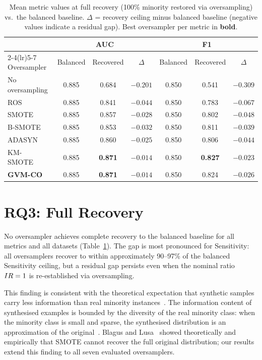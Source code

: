 \begin{table}[ht]
\centering
\caption{Mean metric values at full recovery (100\% minority restored via oversampling) vs.\ the balanced baseline.
$\Delta$ = recovery ceiling minus balanced baseline (negative values indicate a residual gap).
Best oversampler per metric in \textbf{bold}.}
\label{tab:rec_summary}
\setlength{\tabcolsep}{5pt}
\begin{tabular}{l ccc ccc}
\toprule
& \multicolumn{3}{c}{AUC} & \multicolumn{3}{c}{F1} \\
\cmidrule(lr){2-4}\cmidrule(lr){5-7}
Oversampler & Balanced & Recovered & $\Delta$ & Balanced & Recovered & $\Delta$ \\
\midrule
No oversampling   & 0.885 & 0.684 & $-0.201$ & 0.850 & 0.541 & $-0.309$ \\
ROS~\cite{fernandez2018learning}        & 0.885 & 0.841 & $-0.044$ & 0.850 & 0.783 & $-0.067$ \\
SMOTE~\cite{chawla2002smote}            & 0.885 & 0.857 & $-0.028$ & 0.850 & 0.802 & $-0.048$ \\
B-SMOTE~\cite{han2005borderline}        & 0.885 & 0.853 & $-0.032$ & 0.850 & 0.811 & $-0.039$ \\
ADASYN~\cite{he2008adasyn}              & 0.885 & 0.860 & $-0.025$ & 0.850 & 0.806 & $-0.044$ \\
KM-SMOTE~\cite{douzas2018improving}     & 0.885 & \textbf{0.871} & $-0.014$ & 0.850 & \textbf{0.827} & $-0.023$ \\
\textbf{GVM-CO}~\cite{hajiannejad2025circular} & 0.885 & \textbf{0.871} & $-0.014$ & 0.850 & 0.824 & $-0.026$ \\
\bottomrule
\end{tabular}
\end{table}


\section{RQ3: Full Recovery}
\label{sec:rec:rq3}

No oversampler achieves complete recovery to the balanced baseline for all metrics and all datasets (Table~\ref{tab:rec_summary}).
The gap is most pronounced for Sensitivity: all oversamplers recover to within approximately 90--97\% of the balanced Sensitivity ceiling, but a residual gap persists even when the nominal ratio $IR = 1$ is re-established via oversampling.

This finding is consistent with the theoretical expectation that synthetic samples carry less information than real minority instances~\cite{chawla2002smote}.
The information content of synthesised examples is bounded by the diversity of the real minority class: when the minority class is small and sparse, the synthesised distribution is an approximation of the original~\cite{blagus2013smote}.
Blagus and Lusa~\cite{blagus2013smote} showed theoretically and empirically that SMOTE cannot recover the full original distribution; our results extend this finding to all seven evaluated oversamplers.

